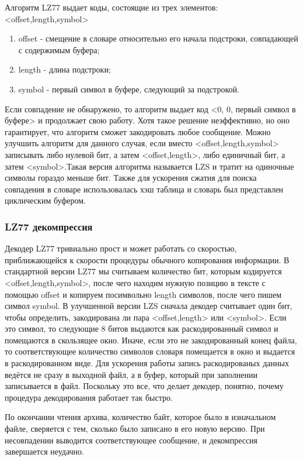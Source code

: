 \documentclass[12pt]{article}
\begin{document}
Алгоритм LZ77 выдает коды, состоящие из трех элементов:<offset,length,symbol>

\begin{enumerate}
	\item offset - смещение в словаре относительно его начала подстроки, совпадающей с содержимым буфера;
	\item length - длина подстроки;
	\item symbol - первый символ в буфере, следующий за подстрокой.
\end{enumerate}

Если совпадение не обнаружено, то алгоритм выдает код <0, 0, первый символ в буфере> и продолжает свою работу. Хотя такое решение неэффективно, но оно гарантирует, что алгоритм сможет закодировать любое сообщение.
Можно улучшить алгоритм для данного случая, если вместо <offset,length,symbol> записывать либо нулевой бит, а затем <offset,length>, либо единичный бит, а затем <symbol>.Такая версия алгоритма называется LZS и тратит на одиночные символы гораздо меньше бит.
Также для ускорения сжатия для поиска совпадения в словаре использовалась хэш таблица и словарь был представлен циклическим буфером.

\subsubsection*{LZ77 декомпрессия}

Декодер LZ77 тривиально прост и может работать со скоростью, приближающейся к скорости процедуры обычного копирования информации.
В стандартной версии LZ77 мы считываем количество бит, которым кодируется <offset,length,symbol>, после чего находим нужную позицию в тексте с помощью offset и копируем посимвольно length символов, после чего пишем символ symbol.
В улучшенной версии LZS сначала декодер считывает один бит, чтобы определить, закодирована ли пара <offset,length> или <symbol>. Если это символ, то следующие 8 битов выдаются как раскодированный символ и помещаются в скользящее окно. Иначе, если это не закодированный конец файла, то соответствующее количество символов словаря помещается в окно и выдается в раскодированном виде.
Для ускорения работы запись раскодированых данных ведётся не сразу в выходной файл, а в буфер, который при заполнении записывается в файл.
Поскольку это все, что делает декодер, понятно, почему процедура декодирования работает так быстро.

По окончании чтения архива, количество байт, которое было в изначальном файле, сверяется с тем, сколько было записано в его новую версию. При несовпадении выводится соответствующее сообщение, и декомпрессия завершается неудачно.
\end{document}
